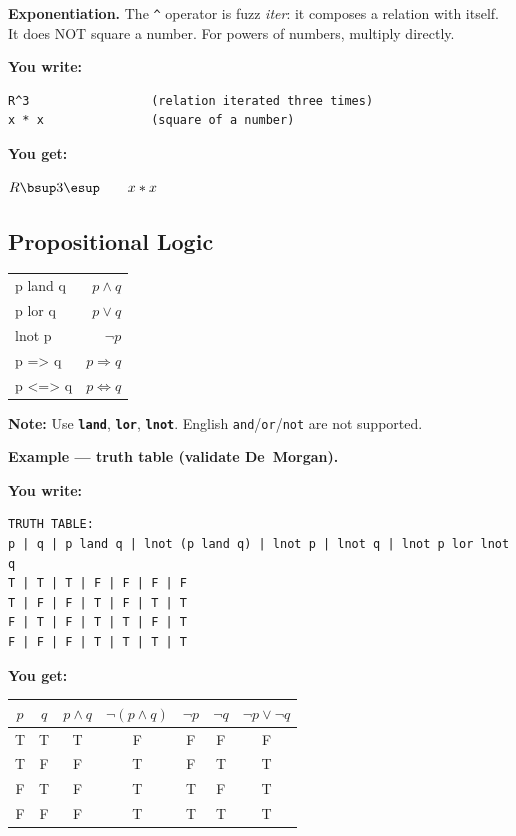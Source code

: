 \documentclass[10pt,landscape,a4paper]{article}
\newcommand{\kw}[1]{\texttt{\bfseries #1}}
\newenvironment{exwrite}%
  {\par\nobreak\noindent\scriptsize\textbf{You write:}\par\nobreak\vspace{0pt}\scriptsize}%
  {\vspace{1pt}\nobreak}
\newenvironment{exget}%
  {\par\nobreak\noindent\scriptsize\textbf{You get:}\par\nobreak\vspace{0pt}\small}%
  {\par\vspace{3pt}}
\begin{document}
\begin{multicols}{2}
{\footnotesize \textbf{Exponentiation.} The \texttt{\^{}} operator is fuzz \textit{iter}: it composes a relation with itself. It does NOT square a number. For powers of numbers, multiply directly.}

\begin{exwrite}%
\begin{verbatim}
R^3                 (relation iterated three times)
x * x               (square of a number)
\end{verbatim}
\end{exwrite}
\begin{exget}%
$R \bsup 3 \esup \qquad x * x$
\end{exget}

\end{multicols}
\begin{multicols}{2}
\raggedcolumns

\section{Propositional Logic}

\begin{tabularx}{\columnwidth}{LR}
p land q             & $p \land q$ \\
p lor q              & $p \lor q$ \\
lnot p               & $\lnot p$ \\
p => q               & $p \Rightarrow q$ \\
p <=> q              & $p \Leftrightarrow q$ \\
\end{tabularx}

{\footnotesize\textbf{Note:} Use \kw{land}, \kw{lor}, \kw{lnot}. English \texttt{and}/\texttt{or}/\texttt{not} are not supported.}

\smallskip
{}
\textbf{Example — truth table (validate De~Morgan).}

\begin{exwrite}%
\begin{verbatim}
TRUTH TABLE:
p | q | p land q | lnot (p land q) | lnot p | lnot q | lnot p lor lnot q
T | T | T | F | F | F | F
T | F | F | T | F | T | T
F | T | F | T | T | F | T
F | F | F | T | T | T | T
\end{verbatim}
\end{exwrite}
\begin{exget}%
\begin{center}
\begin{tabular}{ccccccc}
$p$ & $q$ & $p \land q$ & $\lnot (p \land q)$ & $\lnot p$ & $\lnot q$ & $\lnot p \lor \lnot q$ \\ \hline
T & T & T & F & F & F & F \\
T & F & F & T & F & T & T \\
F & T & F & T & T & F & T \\
F & F & F & T & T & T & T \\
\end{tabular}
\end{center}
\end{exget}


\end{multicols}
\end{document}
